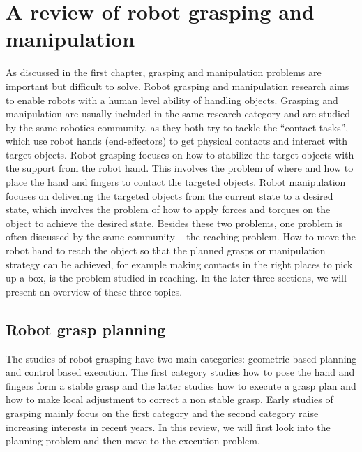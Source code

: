 \section{A review of robot grasping and manipulation}
\label{cha2:sec1}
As discussed in the first chapter, grasping and manipulation problems are important but difficult to solve.
Robot grasping and manipulation research aims to enable robots with a human level ability of handling objects. Grasping and manipulation are usually included in the same research category and are studied by the same robotics community, as they both try to tackle the ``contact tasks'', which  use robot hands (end-effectors) to get physical contacts and interact with target objects.
Robot grasping focuses on how to stabilize the target objects with the support from the robot hand. This involves the problem of where and how to place the hand and fingers to contact the targeted objects. Robot manipulation focuses on delivering the targeted objects from the current state to a desired state, which involves the problem of how to apply forces and torques on the object to achieve the desired state. Besides these two problems, one problem is often discussed by the same community -- the reaching problem. How to move the robot hand to reach the object so that the planned grasps or manipulation strategy can be achieved, for example making contacts in the right places to pick up a box, is the problem studied in reaching. In the later three sections, we will present an overview of these three topics.

\subsection{Robot grasp planning}
\label{cha2:sec1:planning}

The studies of robot grasping have two main categories: geometric based planning and control based execution. The first category studies how to pose the hand and fingers form a stable grasp and the latter studies how to execute a grasp plan and how to make local adjustment to correct a non stable grasp. Early studies of grasping mainly focus on the first category and the second category raise increasing interests in recent years. In this review, we will first look into the planning problem and then move to the execution problem.

